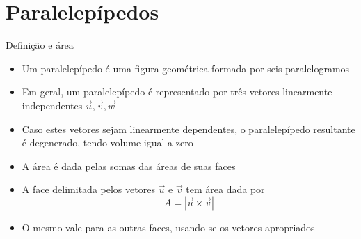 \section{Paralelepípedos}

\begin{frame}[fragile]{Definição e área}

    \begin{itemize}
        \item Um paralelepípedo é uma figura geométrica formada por seis paralelogramos
        \pause

        \item Em geral, um paralelepípedo é representado por três vetores linearmente 
            independentes $\vec{u}, \vec{v}, \vec{w}$
        \pause

        \item Caso estes vetores sejam linearmente dependentes, o paralelepípedo resultante
            é degenerado, tendo volume igual a zero
        \pause

        \item A área é dada pelas somas das áreas de suas faces
        \pause

        \item A face delimitada pelos vetores $\vec{u}$ e $\vec{v}$ tem área dada por
        \[
            A = |\vec{u} \times \vec{v}|
        \] \pause
        \item O mesmo vale para as outras faces, usando-se os vetores apropriados
    \end{itemize}

\end{frame}


